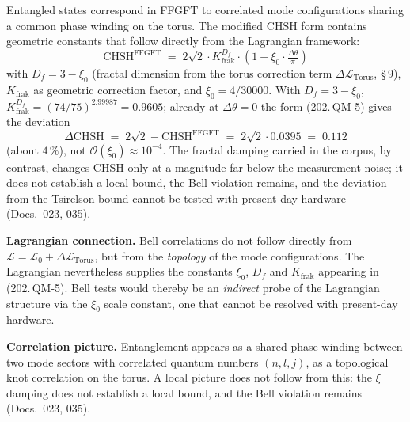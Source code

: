 Entangled states correspond in FFGFT to correlated mode configurations
sharing a common phase winding on the torus. The modified CHSH form
contains geometric constants that follow directly from the Lagrangian
framework:
\begin{equation}
  \mathrm{CHSH}^{\mathrm{FFGFT}}
  \;=\; 2\sqrt{2}\cdot K_{\text{frak}}^{D_f}\cdot
        \left(1 - \xi_0\cdot\tfrac{\Delta\theta}{\pi}\right)
  \tag{202.\,QM-5}
\end{equation}
with $D_f = 3 - \xi_0$ (fractal dimension from the torus correction
term $\Delta\mathcal{L}_{\text{Torus}}$, \S\,9), $K_{\text{frak}}$ as
geometric correction factor, and $\xi_0 = 4/30000$. With $D_f = 3 - \xi_0$,
$K_{\text{frak}}^{D_f} = (74/75)^{2.99987} = 0.9605$; already at
$\Delta\theta = 0$ the form (202.\,QM-5) gives the deviation
\begin{equation}
  \Delta\mathrm{CHSH} \;=\; 2\sqrt{2} - \mathrm{CHSH}^{\mathrm{FFGFT}}
  \;=\; 2\sqrt{2}\cdot 0.0395 \;=\; 0.112
  \tag{202.\,QM-6}
\end{equation}
(about $4\,\%$), not $\mathcal{O}(\xi_0) \approx 10^{-4}$. The fractal
damping carried in the corpus, by contrast, changes CHSH only at a
magnitude far below the measurement noise; it does not establish a
local bound, the Bell violation remains, and the deviation from the
Tsirelson bound cannot be tested with present-day hardware
(Docs.~023, 035).

\textbf{Lagrangian connection.} Bell correlations do not follow
directly from $\mathcal{L} = \mathcal{L}_0 + \Delta\mathcal{L}_{\text{Torus}}$,
but from the \emph{topology} of the mode configurations. The
Lagrangian nevertheless supplies the constants
$\xi_0$, $D_f$ and $K_{\text{frak}}$ appearing in (202.\,QM-5).
Bell tests would thereby be an \emph{indirect} probe of the Lagrangian
structure via the $\xi_0$ scale constant, one that cannot be resolved
with present-day hardware.

\textbf{Correlation picture.} Entanglement appears as a shared phase
winding between two mode sectors with correlated quantum numbers
$(n,l,j)$, as a topological knot correlation on the torus. A local
picture does not follow from this: the $\xi$ damping does not establish
a local bound, and the Bell violation remains (Docs.~023, 035).

